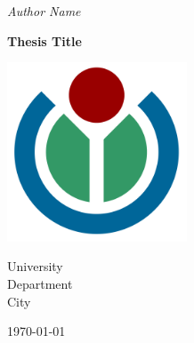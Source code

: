 \begin{titlepage}
    \begin{center}

        \Huge \textit{Author Name}

        \vspace{2cm}

        \Huge \textbf{Thesis Title}

        \vspace{2cm}

        \includegraphics[width=0.4\textwidth]{images/logo.png}

        \vspace{2cm}

        \Large
        University\\
        Department\\
        City

        \vspace{1.5cm}

        \today

    \end{center}
\end{titlepage}
